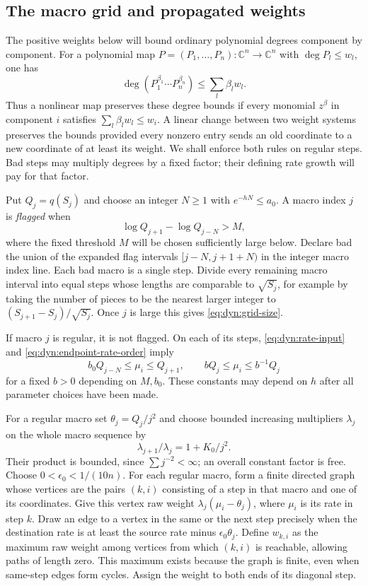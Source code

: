 \documentclass[11pt]{article}
\theoremstyle{definition}
\theoremstyle{remark}
\newcommand{\C}{\mathbb C}
\numberwithin{equation}{section}
\begin{document}
\subsection{The macro grid and propagated weights}

The positive weights below will bound ordinary polynomial degrees
component by component.  For a polynomial map
$P=(P_1,\ldots,P_n):\C^n\to\C^n$ with $\deg P_l\le w_l$, one has
\[
 \deg(P_1^{\beta_1}\cdots P_n^{\beta_n})
 \le\sum_l\beta_lw_l.
\]
Thus a nonlinear map preserves these degree bounds if every monomial
$z^\beta$ in component $i$ satisfies
$\sum_l\beta_lw_l\le w_i$.  A linear change between two weight systems
preserves the bounds provided every nonzero entry sends an old
coordinate to a new coordinate of at least its weight.  We shall
enforce both rules on regular steps.  Bad steps may multiply degrees
by a fixed factor; their defining rate growth will pay for that factor.

Put $Q_j=q(S_j)$ and choose an integer $N\ge1$ with
$e^{-hN}\le a_0$.  A macro index $j$ is \emph{flagged} when
\begin{equation}
 \log Q_{j+1}-\log Q_{j-N}>M,
 \label{eq:dyn:flag}
\end{equation}
where the fixed threshold $M$ will be chosen sufficiently large below.
Declare bad the union of the expanded flag intervals
$[j-N,j+1+N)$ in the integer macro index line.  Each bad macro is a
single step.  Divide every remaining macro interval into equal steps
whose lengths are comparable to $\sqrt{S_j}$, for example by taking
the number of pieces to be the nearest larger integer to
$(S_{j+1}-S_j)/\sqrt{S_j}$.  Once $j$ is large this gives
\eqref{eq:dyn:grid-size}.

If macro $j$ is regular, it is not flagged.  On each of its steps,
\eqref{eq:dyn:rate-input} and \eqref{eq:dyn:endpoint-rate-order} imply
\begin{equation}
 b_0Q_{j-N}\le\mu_i\le Q_{j+1},\qquad
 bQ_j\le\mu_i\le b^{-1}Q_j
 \label{eq:dyn:regular-rates}
\end{equation}
for a fixed $b>0$ depending on $M,b_0$.  These constants may depend on
$h$ after all parameter choices have been made.

For a regular macro set $\theta_j=Q_j/j^2$ and choose bounded increasing
multipliers $\lambda_j$ on the whole macro sequence by
\[
 \lambda_{j+1}/\lambda_j=1+K_0/j^2.
\]
Their product is bounded, since $\sum j^{-2}<\infty$; an overall
constant factor is free.  Choose $0<\epsilon_0<1/(10n)$.
For each regular macro, form a finite directed graph whose vertices
are the pairs $(k,i)$ consisting of a step in that macro and one of
its coordinates.  Give this vertex raw weight
$\lambda_j(\mu_i-\theta_j)$, where $\mu_i$ is its rate in step $k$.
Draw an edge to a vertex in the same or the next step precisely when
the destination rate is at least the source rate minus
$\epsilon_0\theta_j$.  Define $w_{k,i}$ as the maximum raw weight
among vertices from which $(k,i)$ is reachable, allowing paths of
length zero.  This maximum exists because the graph is finite, even
when same-step edges form cycles.  Assign the weight to both ends of
its diagonal step.
\end{document}
